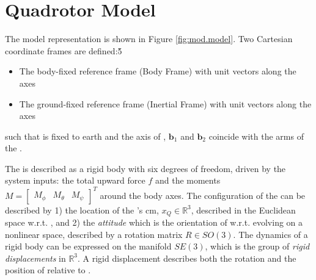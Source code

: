 \section{Quadrotor Model}
The  model representation is shown in Figure \ref{fig:mod.model}. Two Cartesian coordinate frames are defined:\v{5}
\begin{itemize}
	\setlength\itemsep{.2pt}
	\item The body-fixed reference frame  (Body Frame)
	\subitem with unit vectors  along the axes
	\item The ground-fixed reference frame  (Inertial Frame)
	\subitem with unit vectors  along the axes								
\end{itemize}
such that \IF is fixed to earth and the axis of \BF, $ \mathbf{b}_1$ and $\mathbf{b}_2 $ coincide with the arms of the .

The  is described as a rigid body with six degrees of freedom, driven by the system inputs: the total upward force $ f $ and the moments $ M=\begin{bmatrix}	M_\phi&M_\theta&M_\psi	\end{bmatrix}^T $ around the body axes. 
The configuration of the  can be described by 1) the location of the 's \acf{cm}, $x_Q\in \mathbb{R}^3 $, described in the Euclidean space w.r.t. \IF, and 2) the \textit{attitude} which is the orientation of \BF w.r.t. \IF evolving on a nonlinear space, described by a rotation matrix $R\in SO(3) $. The dynamics of a rigid body can be expressed on the manifold $ SE(3) $, which is the group of \textit{rigid displacements} in $ \mathbb{R}^3 $. A rigid displacement describes both the rotation and the position of \BF relative to \IF.

